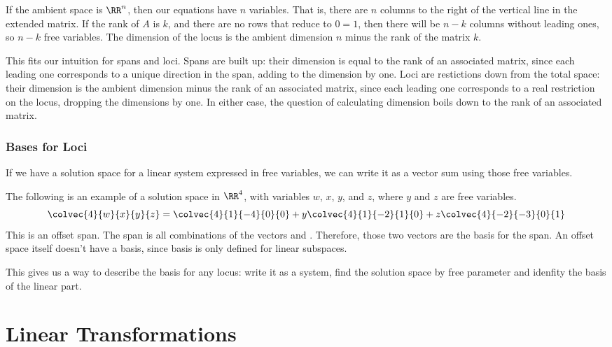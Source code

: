 \documentclass[fleqn]{report}
\begin{document}
If the ambient space is $\RR^n$, then our equations have $n$
variables. That is, there are $n$ columns to the right of the
vertical line in the extended matrix. If the rank of $A$ is $k$,
and there are no rows that reduce to $0=1$, then there will be
$n-k$ columns without leading ones, so $n-k$ free variables.
The dimension of the locus is the ambient dimension $n$ minus
the rank of the matrix $k$.

This fits our intuition for spans and loci. Spans are built up:
their dimension is equal to the rank of an associated matrix,
since each leading one corresponds to a unique direction in the
span, adding to the dimension by one. Loci are restictions down
from the total space: their dimension is the ambient dimension
minus the rank of an associated matrix, since each leading one 
corresponds to a real restriction on the locus, dropping the
dimensions by one. In either case, the question of calculating
dimension boils down to the rank of an associated matrix.

\subsection{Bases for Loci}
\label{bases-for-loci}

If we have a solution space for a linear system expressed in
free variables, we can write it as a vector sum using those
free variables. 

\begin{example}
The following is an example of a solution space in $\RR^4$,
with variables $w$, $x$, $y$, and $z$, where $y$ and $z$ are
free variables.
\begin{equation*}
\colvec{4}{w}{x}{y}{z} = \colvec{4}{1}{-4}{0}{0} + y
\colvec{4}{1}{-2}{1}{0} + z \colvec{4}{-2}{-3}{0}{1}
\end{equation*}
This is an offset span. The span is all combinations of the
vectors  and 
. Therefore, those
two vectors are the basis for the span. An offset space itself
doesn't have a basis, since basis is only defined for linear
subspaces. 

This gives us a way to describe the basis for any locus: write
it as a system, find the solution space by free parameter and
idenfity the basis of the linear part. 
\end{example}

\chapter{Linear Transformations}
\label{linear-transformations}
\end{document}
